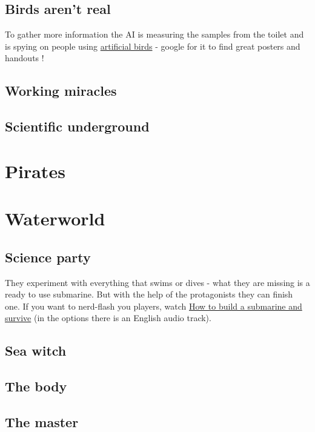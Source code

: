 \subsection{Birds aren't real}

To gather more information the AI is measuring the samples from the toilet and is spying on people using \href{https://en.wikipedia.org/wiki/Birds_Aren%27t_Real}{artificial birds} - google for it to find great posters and handouts !

\subsection{Working miracles}


\subsection{Scientific underground}

\section{Pirates}

\section{Waterworld}

\subsection{Science party}

They experiment with everything that swims or dives - what they are missing is a ready to use submarine. But with the help of the protagonists they can finish one. If you want to nerd-flash you players, watch \href{https://media.ccc.de/v/37c3-11828-how_to_build_a_submarine_and_survive}{How to build a submarine and survive} (in the options there is an English audio track).

\subsection{Sea witch}

\subsection{The body}

\subsection{The master}

